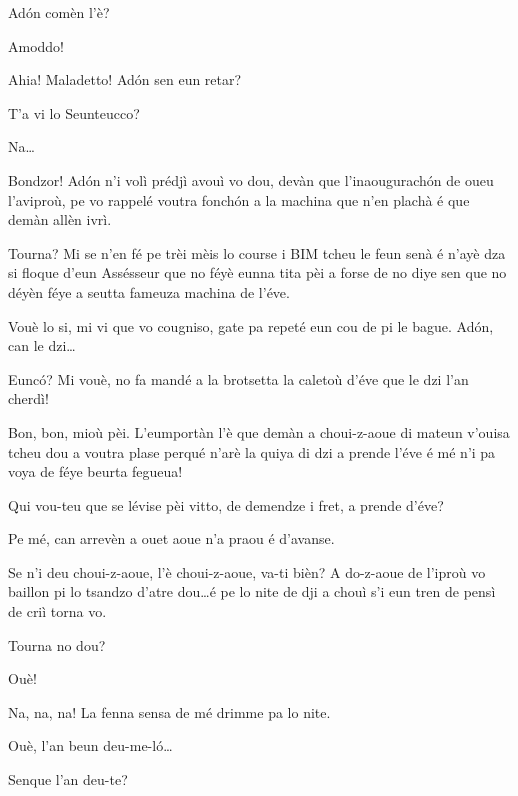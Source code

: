\begin{drama}
\Diegospeaks{} Ad\'on comèn l'è?

\Attilaspeaks {} Amoddo!

\Diegospeaks{} Ahia! Maladetto! Ad\'on sen eun retar?

\Seunteuccospeaks T'a vi lo Seunteucco?

\Attilaspeaks Na\ldots


\Seunteuccospeaks Bondzor! Ad\'on n’i volì prédjì avouì vo dou, devàn que l’inaougurach\'on de oueu l’aviproù, pe vo rappelé voutra fonch\'on a la machina que n'en plachà é que demàn allèn ivrì.

\Diegospeaks Tourna? Mi se n'en fé pe trèi mèis lo course i BIM tcheu le feun senà é n'ayè dza si floque d'eun Assésseur que no féyè eunna tita pèi a forse de no diye sen que no déyèn féye a seutta fameuza machina de l'éve.

\Seunteuccospeaks Vouè lo si, mi vi que vo cougniso, gate pa repeté eun cou de pi le bague. Ad\'on, can le dzi\ldots

\Attilaspeaks{} Eunc\'o? Mi vouè, no fa mandé a la bro\-tsetta la caletoù d’éve que le dzi l’an cherdì!

\Seunteuccospeaks Bon, bon, mioù pèi. L’eumportàn l’è que demàn a choui-z-aoue di mateun v'ouisa tcheu dou a voutra plase perqué n’arè la quiya di dzi a prende l’éve é mé n’i pa voya de féye beurta fegueua!

\Diegospeaks Qui vou-teu que se lévise pèi vitto, de demendze i fret, a prende d’éve?

\Attilaspeaks Pe mé, can arrevèn a ouet aoue n’a praou é d'avanse.

\Seunteuccospeaks Se n’i deu choui-z-aoue, l’è choui-z-aoue, va-ti bièn? A do-z-aoue de l’iproù vo baillon pi lo tsandzo d'atre dou\ldots é pe lo nite de dji a chouì s'i eun tren de pensì de criì torna vo.

\Diegospeaks Tourna no dou?

\Seunteuccospeaks Ouè!

\Attilaspeaks Na, na, na! La fenna sensa de mé drimme pa lo nite.

\Diegospeaks {} Ouè, l’an beun deu-me-l\'o\ldots \malisieu

\Diegospeaks {} Senque l'an deu-te?


\end{drama}
